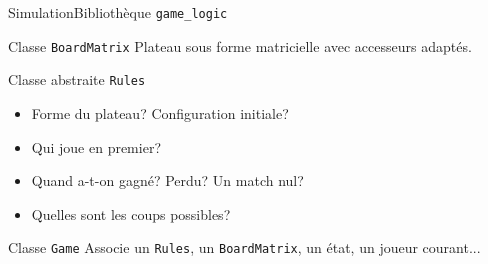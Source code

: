 
\begin{frame}{Simulation}{Bibliothèque \texttt{game\_logic}}

\begin{block}{Classe \texttt{BoardMatrix}}
Plateau sous forme matricielle avec accesseurs adaptés.
\end{block}

\pause

\begin{block}{Classe abstraite \texttt{Rules}}
\begin{itemize}
\item Forme du plateau? Configuration initiale?
\item Qui joue en premier?
\item Quand a-t-on gagné? Perdu? Un match nul?
\item Quelles sont les coups possibles?
\end{itemize}
\end{block}

\pause

\begin{block}{Classe \texttt{Game}}
Associe un \texttt{Rules}, un \texttt{BoardMatrix}, un état, un joueur courant...
\end{block}

\end{frame}